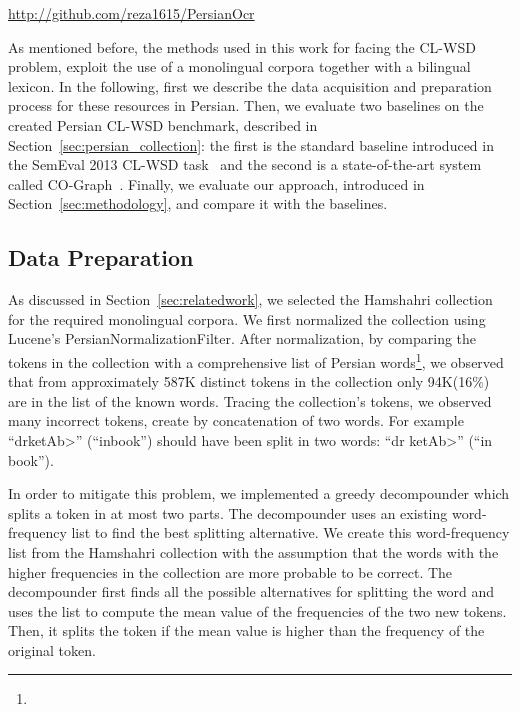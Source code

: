 \urldef{\persianwordlist}\url{http://github.com/reza1615/PersianOcr}

As mentioned before, the methods used in this work for facing the CL-WSD problem, exploit the use of a monolingual corpora together with a bilingual lexicon. In the following, first we describe the data acquisition and preparation process for these resources in Persian. Then, we evaluate two baselines on the created Persian CL-WSD benchmark, described in Section~\ref{sec:persian_collection}: the first is the standard baseline introduced in the SemEval 2013 CL-WSD task~\cite{lefever2013semeval} and the second is a state-of-the-art system called CO-Graph~\cite{duqueco}. Finally, we evaluate our approach, introduced in Section~\ref{sec:methodology}, and compare it with the baselines.

\vspace{-0.2cm}
\subsection{Data Preparation}

As discussed in Section~\ref{sec:relatedwork}, we selected the Hamshahri collection for the required monolingual corpora. We first normalized the collection using Lucene's PersianNormalizationFilter. After normalization, by comparing the tokens in the collection with a comprehensive list of Persian words\footnote{\persianwordlist}, we observed that from approximately 587K distinct tokens in the collection only 94K(16\%) are in the list of the known words. Tracing the collection's tokens, we observed many incorrect tokens, create by concatenation of two words. For example ``\<drketAb>'' (``inbook'') should have been split in two words: ``\<dr ketAb>'' (``in book'').%

In order to mitigate this problem, we implemented a greedy decompounder which splits a token in at most two parts. The decompounder uses an existing word-frequency list to find the best splitting alternative. We create this word-frequency list from the Hamshahri collection with the assumption that the words with the higher frequencies in the collection are more probable to be correct. The decompounder first finds all the possible alternatives for splitting the word and uses the list to compute the mean value of the frequencies of the two new tokens. Then, it splits the token if the mean value is higher than the frequency of the original token.

